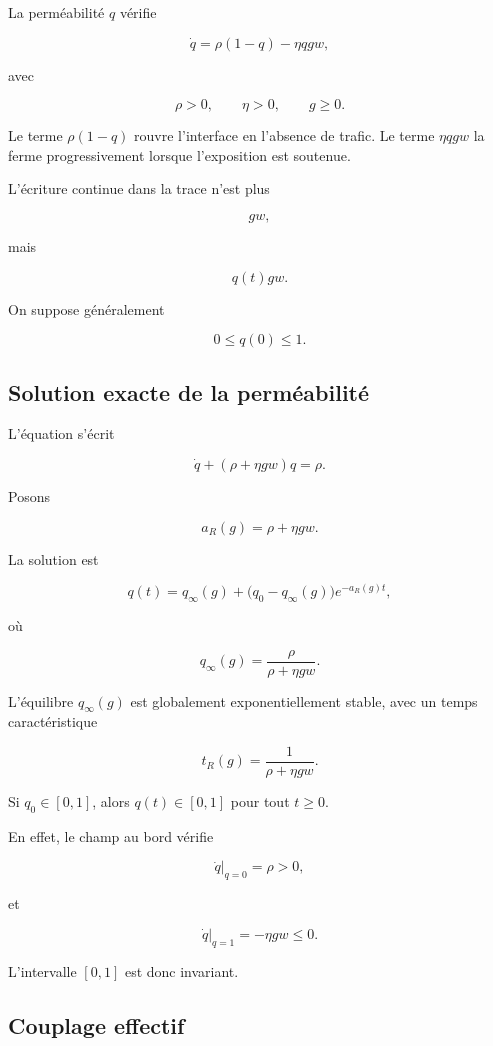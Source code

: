La perméabilité \(q\) vérifie

\[
\dot q
=
\rho(1-q)
-
\eta qgw,
\]

avec

\[
\rho>0,
\qquad
\eta>0,
\qquad
g\geq0.
\]

Le terme \(\rho(1-q)\) rouvre l'interface en l'absence de trafic. Le
terme \(\eta qgw\) la ferme progressivement lorsque l'exposition est
soutenue.

L'écriture continue dans la trace n'est plus

\[
gw,
\]

mais

\[
q(t)gw.
\]

On suppose généralement

\[
0\leq q(0)\leq1.
\]

\subsection{Solution exacte de la perméabilité}
\label{annexe-r1-solution}

L'équation s'écrit

\[
\dot q
+
(\rho+\eta gw)q
=
\rho.
\]

Posons

\[
a_R(g)
=
\rho+\eta gw.
\]

La solution est

\[
\boxed{
q(t)
=
q_\infty(g)
+
\bigl(q_0-q_\infty(g)\bigr)
e^{-a_R(g)t},
}
\]

où

\[
\boxed{
q_\infty(g)
=
\frac{\rho}
{\rho+\eta gw}.
}
\]

L'équilibre \(q_\infty(g)\) est globalement exponentiellement stable,
avec un temps caractéristique

\[
\boxed{
t_R(g)
=
\frac{1}{\rho+\eta gw}.
}
\]

Si \(q_0\in[0,1]\), alors \(q(t)\in[0,1]\) pour tout \(t\geq0\).

En effet, le champ au bord vérifie

\[
\dot q\big|_{q=0}=\rho>0,
\]

et

\[
\dot q\big|_{q=1}=-\eta gw\leq0.
\]

L'intervalle \([0,1]\) est donc invariant.

\subsection{Couplage effectif}
\label{annexe-r1-couplage-effectif}

